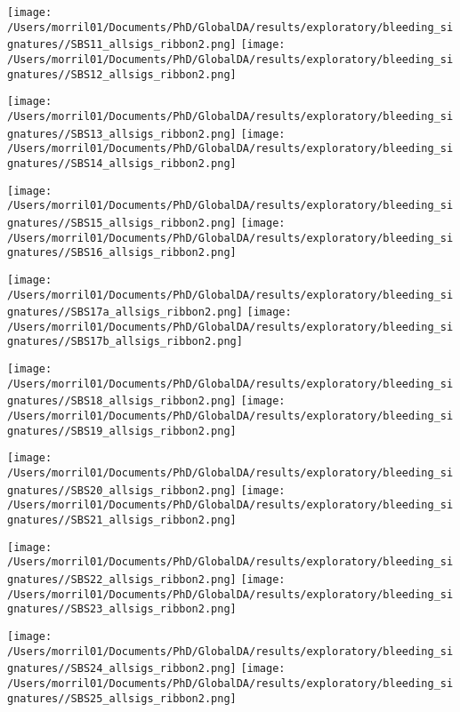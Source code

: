 \documentclass{article}
\begin{document}
\hspace{-1in}\texttt{[image: /Users/morril01/Documents/PhD/GlobalDA/results/exploratory/bleeding\_signatures//SBS11\_allsigs\_ribbon2.png]} \texttt{[image: /Users/morril01/Documents/PhD/GlobalDA/results/exploratory/bleeding\_signatures//SBS12\_allsigs\_ribbon2.png]} 

\hspace{-1in}\texttt{[image: /Users/morril01/Documents/PhD/GlobalDA/results/exploratory/bleeding\_signatures//SBS13\_allsigs\_ribbon2.png]} 
\texttt{[image: /Users/morril01/Documents/PhD/GlobalDA/results/exploratory/bleeding\_signatures//SBS14\_allsigs\_ribbon2.png]} 

\hspace{-1in}\texttt{[image: /Users/morril01/Documents/PhD/GlobalDA/results/exploratory/bleeding\_signatures//SBS15\_allsigs\_ribbon2.png]} 
\texttt{[image: /Users/morril01/Documents/PhD/GlobalDA/results/exploratory/bleeding\_signatures//SBS16\_allsigs\_ribbon2.png]} 

\hspace{-1in}\texttt{[image: /Users/morril01/Documents/PhD/GlobalDA/results/exploratory/bleeding\_signatures//SBS17a\_allsigs\_ribbon2.png]} \texttt{[image: /Users/morril01/Documents/PhD/GlobalDA/results/exploratory/bleeding\_signatures//SBS17b\_allsigs\_ribbon2.png]}

\hspace{-1in} \texttt{[image: /Users/morril01/Documents/PhD/GlobalDA/results/exploratory/bleeding\_signatures//SBS18\_allsigs\_ribbon2.png]} \texttt{[image: /Users/morril01/Documents/PhD/GlobalDA/results/exploratory/bleeding\_signatures//SBS19\_allsigs\_ribbon2.png]} 
 
\hspace{-1in}  \texttt{[image: /Users/morril01/Documents/PhD/GlobalDA/results/exploratory/bleeding\_signatures//SBS20\_allsigs\_ribbon2.png]} 
\texttt{[image: /Users/morril01/Documents/PhD/GlobalDA/results/exploratory/bleeding\_signatures//SBS21\_allsigs\_ribbon2.png]}

\hspace{-1in} \texttt{[image: /Users/morril01/Documents/PhD/GlobalDA/results/exploratory/bleeding\_signatures//SBS22\_allsigs\_ribbon2.png]} \texttt{[image: /Users/morril01/Documents/PhD/GlobalDA/results/exploratory/bleeding\_signatures//SBS23\_allsigs\_ribbon2.png]} 

\hspace{-1in}\texttt{[image: /Users/morril01/Documents/PhD/GlobalDA/results/exploratory/bleeding\_signatures//SBS24\_allsigs\_ribbon2.png]} \texttt{[image: /Users/morril01/Documents/PhD/GlobalDA/results/exploratory/bleeding\_signatures//SBS25\_allsigs\_ribbon2.png]}
\end{document}
